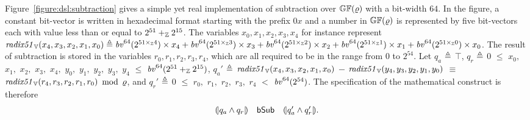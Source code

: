 Figure~\ref{figure:dsl:subtraction} gives a simple yet real implementation of subtraction over $\bbfGF(\myprime)$ with a bit-width $64$.
In the figure, a constant bit-vector is written in hexadecimal format starting with the prefix $0x$ and a number in $\bbfGF(\varrho)$ is represented by five bit-vectors each with value less than or equal to $2^{51} +_\bbfZ 2^{15}$.
The variables ${x}_0, {x}_1, {x}_2, {x}_3, {x}_4$ for instance represent $\mathit{radix51}_\BV({x}_4, {x}_3, {x}_2, {x}_1, {x}_0) \defn \bv^{64}(2^{51 \times_\bbfZ 4}) \times {x}_4 + \bv^{64}(2^{51 \times_\bbfZ 3}) \times {x}_3 + \bv^{64}(2^{51 \times_\bbfZ 2}) \times {x}_2 + \bv^{64}(2^{51 \times_\bbfZ 1}) \times {x}_1 + \bv^{64}(2^{51 \times_\bbfZ 0}) \times {x}_0$.
The result of subtraction is stored in the variables ${r}_0, {r}_1, {r}_2, {r}_3, {r}_4$, which are all required to be in the range from $0$ to $2^{54}$.
Let $q_a$ $\defn$ $\top$, $q_r$ $\defn$ $0$ $\leq$ ${x}_0,$ ${x}_1,$ ${x}_2,$ ${x}_3,$ ${x}_4,$ ${y}_0,$ ${y}_1,$ ${y}_2,$ ${y}_3,$ ${y}_4$ $\leq$ $\bv^{64}(2^{51} +_\bbfZ 2^{15})$, $q_a'$ $\defn$ $\mathit{radix51}_\BV({x}_4, {x}_3, {x}_2, {x}_1, {x}_0)$ $-$ $\mathit{radix51}_\BV({y}_4, {y}_3, {y}_2, {y}_1, {y}_0)$ $\equiv$ $\mathit{radix51}_\BV({r}_4, {r}_3, {r}_2, {r}_1, {r}_0)$ $\mod$ $\myprime$, and $q_r'$ $\defn$ $0$ $\leq$ ${r}_0,$ ${r}_1,$ ${r}_2,$ ${r}_3,$ ${r}_4$ $<$ $\bv^{64}(2^{54})$.
The specification of the mathematical construct is therefore
\[
\begin{array}{rcl}
\cond{q_a \wedge q_r} &
\dslcode{bSub} &
\cond{q_a' \wedge q_r'}.
\end{array}
\]


